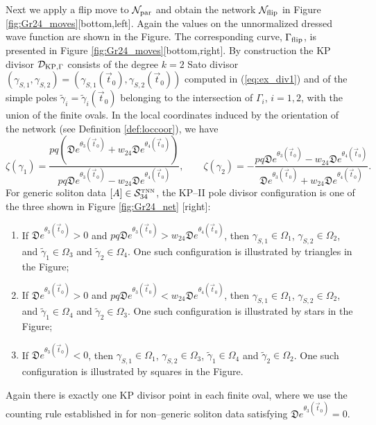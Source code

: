 \documentclass[11pt]{amsart}
\theoremstyle{plain}
\numberwithin{equation}{section}
\def \DKP {{\mathcal D}_{\textup{\scriptsize KP},\Gamma}}
\begin{document}
Next we apply a flip move to ${\mathcal N}_{\mbox{\scriptsize par}}$ and obtain the network  ${\mathcal N}_{{\mbox{\scriptsize flip}}}$ in Figure \ref{fig:Gr24_moves}[bottom,left]. Again the values on the unnormalized dressed wave function are shown in the Figure. The corresponding curve,  ${\Gamma}_{\mbox{\scriptsize flip}}$, is presented in Figure \ref{fig:Gr24_moves}[bottom,right]. By construction the KP divisor $\DKP$ consists of the degree $k=2$ Sato divisor $(\gamma_{S,1} ,\gamma_{S,2} )=(\gamma_{S,1} (\vec t_0),\gamma_{S,2} (\vec t_0))$ computed in (\ref{eq:ex_div1}) and of the simple poles $\tilde \gamma_{i}=\tilde \gamma_{i} (\vec t_0)$ belonging to the intersection of 
$\Gamma_{i}$, $i=1,2$, with the union of the finite ovals. In the local coordinates induced by the orientation of the network (see Definition \ref{def:loccoor}), we have
\begin{equation}\label{eq:ex_div3}
\zeta(\gamma_{1}) = \frac{pq \left({\mathfrak D} e^{\theta_3(\vec t_0)} + w_{24} {\mathfrak D} e^{\theta_4(\vec t_0)} \right)}{{pq\mathfrak D} e^{\theta_3(\vec t_0)}- w_{24} 
{\mathfrak D} e^{\theta_4(\vec t_0)}}, \quad\quad   \zeta(\gamma_{2}) = -\frac{pq{\mathfrak D} e^{\theta_3(\vec t_0)}- w_{24} 
{\mathfrak D} e^{\theta_4(\vec t_0)}}{{\mathfrak D} e^{\theta_3(\vec t_0)} + w_{24} {\mathfrak D} e^{\theta_4(\vec t_0)}}.
\end{equation}
For generic soliton data $[A]\in {\mathcal S}_{34}^{\mbox{\tiny TNN}}$, the KP--II pole divisor configuration is one of the three shown in Figure \ref{fig:Gr24_net} [right]:
\begin{enumerate}
\item If ${\mathfrak D} e^{\theta_3(\vec t_0)}>0$  and $pq{\mathfrak D} e^{\theta_3(\vec t_0)}> w_{24} 
{\mathfrak D} e^{\theta_4(\vec t_0)}$, then $\gamma_{S,1} \in \Omega_1$, $\gamma_{S,2} \in \Omega_2$,
 and $\tilde \gamma_{1} \in \Omega_3$ and $\tilde \gamma_{2} \in \Omega_4$. One such configuration is illustrated by triangles in the Figure;
\item If ${\mathfrak D} e^{\theta_3(\vec t_0)}>0$  and $pq{\mathfrak D} e^{\theta_3(\vec t_0)}< w_{24} 
{\mathfrak D} e^{\theta_4(\vec t_0)}$, then $\gamma_{S,1} \in \Omega_1$, $\gamma_{S,2} \in \Omega_2$,
 and $\tilde \gamma_{1} \in \Omega_4$ and $\tilde \gamma_{2} \in \Omega_3$. One such configuration is illustrated by stars in the Figure;
\item If ${\mathfrak D} e^{\theta_3(\vec t_0)}<0$, then $\gamma_{S,1} \in \Omega_1$, $\gamma_{S,2} \in \Omega_3$, $\tilde \gamma_{1} \in \Omega_4$ and $\tilde \gamma_{2} \in \Omega_2$. One such configuration is illustrated by squares in the Figure.
\end{enumerate}
Again there is exactly one KP divisor point in each finite oval, where we use the counting rule established in \cite{AG1} for non--generic soliton data satisfying ${\mathfrak D} e^{\theta_3(\vec t_0)}=0$.
\end{document}
